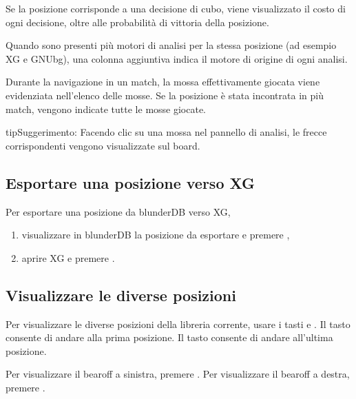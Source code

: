 \documentclass[letterpaper,10pt,italian]{sphinxmanual}
\begin{document}
\sphinxAtStartPar
Se la posizione corrisponde a una decisione di cubo, viene visualizzato il costo di ogni decisione, oltre alle probabilità di vittoria della posizione.

\sphinxAtStartPar
Quando sono presenti più motori di analisi per la stessa posizione (ad esempio XG e GNUbg), una colonna aggiuntiva indica il motore di origine di ogni analisi.

\sphinxAtStartPar
Durante la navigazione in un match, la mossa effettivamente giocata viene evidenziata nell’elenco delle mosse. Se la posizione è stata incontrata in più match, vengono indicate tutte le mosse giocate.

\begin{sphinxadmonition}{tip}{Suggerimento:}
\sphinxAtStartPar
Facendo clic su una mossa nel pannello di analisi, le frecce corrispondenti vengono visualizzate sul board.
\end{sphinxadmonition}


\subsection{Esportare una posizione verso XG}
\label{\detokenize{guide_utilisateur:exporter-une-position-vers-xg}}
\sphinxAtStartPar
Per esportare una posizione da blunderDB verso XG,
\begin{enumerate}
%
\item {} 
\sphinxAtStartPar
visualizzare in blunderDB la posizione da esportare e premere ,

\item {} 
\sphinxAtStartPar
aprire XG e premere .

\end{enumerate}


\subsection{Visualizzare le diverse posizioni}
\label{\detokenize{guide_utilisateur:visualiser-les-differentes-positions}}
\sphinxAtStartPar
Per visualizzare le diverse posizioni della libreria corrente, usare i tasti  e . Il tasto  consente di andare alla prima posizione. Il tasto  consente di andare all’ultima posizione.

\sphinxAtStartPar
Per visualizzare il bearoff a sinistra, premere . Per visualizzare il bearoff a destra, premere .
\end{document}
